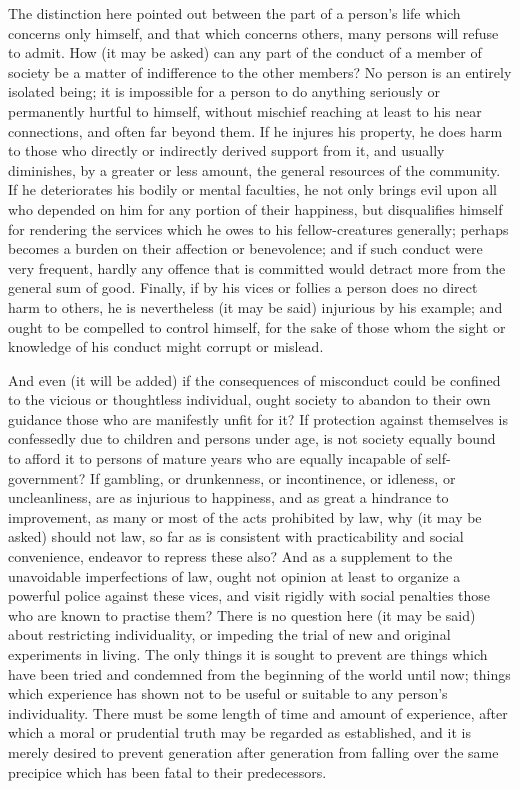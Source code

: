 \documentclass[12pt]{report}
\begin{document}
The distinction here pointed out between the part of a person's life which concerns only himself, and that which concerns others, many persons will refuse to admit. How (it may be asked) can any part of the conduct of a member of society be a matter of indifference to the other members? No person is an entirely isolated being; it is impossible for a person to do anything seriously or permanently hurtful to himself, without mischief reaching at least to his near connections, and often far beyond them. If he injures his property, he does harm to those who directly or indirectly derived support from it, and usually diminishes, by a greater or less amount, the general resources of the community. If he deteriorates his bodily or mental faculties, he not only brings evil upon all who depended on him for any portion of their happiness, but disqualifies himself for rendering the services which he owes to his fellow-creatures generally; perhaps becomes a burden on their affection or benevolence; and if such conduct were very frequent, hardly any offence that is committed would detract more from the general sum of good. Finally, if by his vices or follies a person does no direct harm to others, he is nevertheless (it may be said) injurious by his example; and ought to be compelled to control himself, for the sake of those whom the sight or knowledge of his conduct might corrupt or mislead.

And even (it will be added) if the consequences of misconduct could be confined to the vicious or thoughtless individual, ought society to abandon to their own guidance those who are manifestly unfit for it? If protection against themselves is confessedly due to children and persons under age, is not society equally bound to afford it to persons of mature years who are equally incapable of self-government? If gambling, or drunkenness, or incontinence, or idleness, or uncleanliness, are as injurious to happiness, and as great a hindrance to improvement, as many or most of the acts prohibited by law, why (it may be asked) should not law, so far as is consistent with practicability and social convenience, endeavor to repress these also? And as a supplement to the unavoidable imperfections of law, ought not opinion at least to organize a powerful police against these vices, and visit rigidly with social penalties those who are known to practise them? There is no question here (it may be said) about restricting individuality, or impeding the trial of new and original experiments in living. The only things it is sought to prevent are things which have been tried and condemned from the beginning of the world until now; things which experience has shown not to be useful or suitable to any person's individuality. There must be some length of time and amount of experience, after which a moral or prudential truth may be regarded as established, and it is merely desired to prevent generation after generation from falling over the same precipice which has been fatal to their predecessors.
\end{document}
